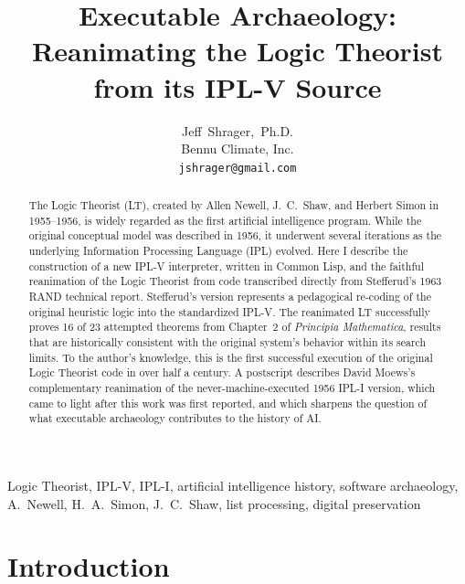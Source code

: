 \documentclass[journal]{IEEEtran}
\begin{document}
\title{Executable Archaeology: Reanimating the Logic Theorist from its
  IPL-V Source}

\author{Jeff~Shrager,~Ph.D.\\
Bennu Climate, Inc.\\
\texttt{jshrager@gmail.com}}

\maketitle

\begin{abstract}

The Logic Theorist (LT), created by Allen Newell, J.~C.~Shaw, and
Herbert Simon in 1955--1956, is widely regarded as the first
artificial intelligence program. While the original conceptual model
was described in 1956, it underwent several iterations as the
underlying Information Processing Language (IPL) evolved. Here I
describe the construction of a new IPL-V interpreter, written in
Common Lisp, and the faithful reanimation of the Logic Theorist from
code transcribed directly from Stefferud's 1963 RAND technical report.
Stefferud's version represents a pedagogical re-coding of the original
heuristic logic into the standardized IPL-V. The reanimated LT
successfully proves 16 of 23 attempted theorems from Chapter~2 of
\textit{Principia Mathematica}, results that are historically
consistent with the original system's behavior within its search
limits. To the author's knowledge, this is the first successful
execution of the original Logic Theorist code in over half a
century. A postscript describes David Moews's complementary
reanimation of the never-machine-executed 1956 IPL-I version, which
came to light after this work was first reported, and which sharpens
the question of what executable archaeology contributes to the history
of AI.

\end{abstract}


\begin{IEEEkeywords}
Logic Theorist, IPL-V, IPL-I, artificial intelligence history,
software archaeology, A.~Newell, H.~A.~Simon, J.~C.~Shaw, list
processing, digital preservation
\end{IEEEkeywords}

\section{Introduction}
\label{sec:intro}
\end{document}

